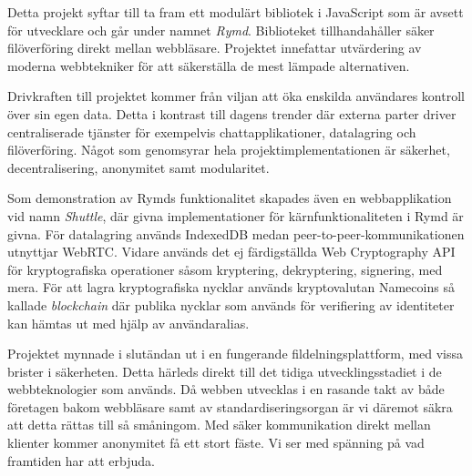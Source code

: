 Detta projekt syftar till ta fram ett modulärt bibliotek i JavaScript som är avsett för utvecklare och går under namnet \emph{Rymd}. Biblioteket tillhandahåller säker filöverföring direkt mellan webbläsare. Projektet innefattar utvärdering av moderna webbtekniker för att säkerställa de mest lämpade alternativen.

Drivkraften till projektet kommer från viljan att öka enskilda användares kontroll över sin egen data. Detta i kontrast till dagens trender där externa parter driver centraliserade tjänster för exempelvis chattapplikationer, datalagring och filöverföring. Något som genomsyrar hela projektimplementationen är säkerhet, decentralisering, anonymitet samt modularitet. 

Som demonstration av Rymds funktionalitet skapades även en webbapplikation vid namn \emph{Shuttle}, där givna implementationer för kärnfunktionaliteten i Rymd är givna. För datalagring används IndexedDB medan peer-to-peer-kommunikationen utnyttjar WebRTC. Vidare används det ej färdigställda Web Cryptography API för kryptografiska operationer såsom kryptering, dekryptering, signering, med mera. För att lagra kryptografiska nycklar används kryptovalutan Namecoins så kallade \emph{blockchain} där publika nycklar som används för verifiering av identiteter kan hämtas ut med hjälp av användaralias.

Projektet mynnade i slutändan ut i en fungerande fildelningsplattform, med vissa brister i säkerheten. Detta härleds direkt till det tidiga utvecklingsstadiet i de webbteknologier som används. Då webben utvecklas i en rasande takt av både företagen bakom webbläsare samt av standardiseringsorgan är vi däremot säkra att detta rättas till så småningom. Med säker kommunikation direkt mellan klienter kommer anonymitet få ett stort fäste. Vi ser med spänning på vad framtiden har att erbjuda.
